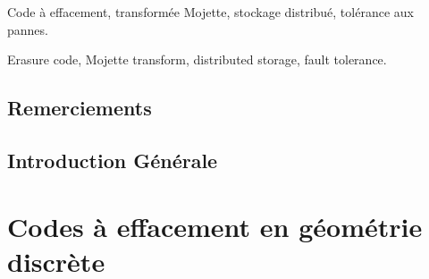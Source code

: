 \begin{resume}
    \footnotesize
    
\end{resume}

\begin{motscles}
    Code à effacement, transformée Mojette, stockage distribué,
    tolérance aux pannes.
\end{motscles}

\begin{abstract}
    \footnotesize
    
\end{abstract}

\begin{keywords}
    Erasure code, Mojette transform, distributed storage, fault tolerance.
\end{keywords}

\maketitle

\chapter*{Remerciements}




\dominitoc
\tableofcontents

\newrefsegment

\chapter*{Introduction Générale}



%

\part{Codes à effacement en géométrie discrète}


%


%


%

